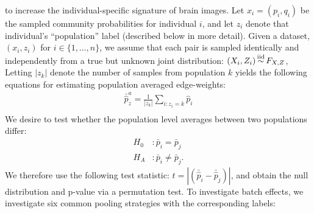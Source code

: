 \documentclass[11pt]{article}
\begin{document}
 to increase the individual-specific signature of brain images.
 Let $x_i = (p_i,q_i)$ be the sampled community probabilities for individual $i$, and let $z_i$ denote that individual's ``population'' label (described below in more detail).
Given a dataset, $(x_i,z_i)$ for $i \in \{1,\ldots,n\}$,  we assume that each pair is sampled identically and independently from a true but unknown joint distribution: 
$(X_i, Z_i) \operatorname*{\overset{iid}{\sim}} F_{X, Z}$,
Letting $|z_k|$  denote the number of samples from population $k$ yields the following equations for estimating population averaged edge-weights:
\begin{align*}
        \bar{\hat{p}}^a_z = \frac{1}{|z_k|}\sum_{i : z_i = k}\hat{p}_i \\
\end{align*}
%
We desire to test whether the population level averages between two populations differ:
\begin{align*}
        H_0&: \bar{p}_i = \bar{p}_j \\
        H_A&: \bar{p}_i \neq \bar{p}_j.
\end{align*}
We therefore use the following test statistic:  $t= |(\bar{\hat{p}}_i - \bar{\hat{p}}_j) |$, and obtain the null distribution and p-value via a permutation test.
%
To investigate batch effects, we investigate six common pooling strategies with the corresponding labels:
\end{document}
